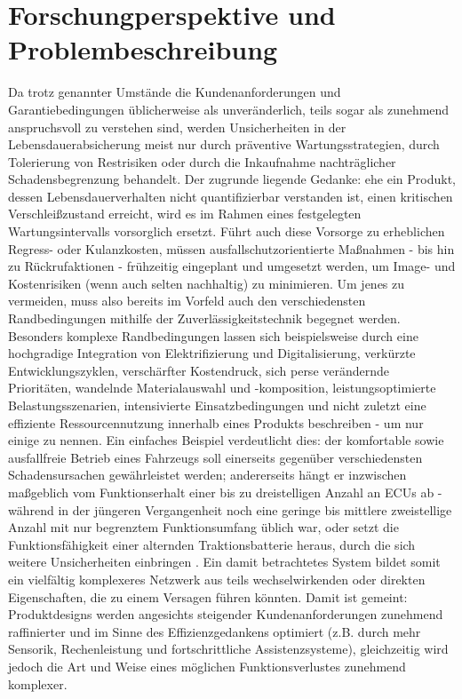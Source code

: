 \section{Forschungperspektive und Problembeschreibung}
Da trotz genannter Umstände die Kundenanforderungen und Garantiebedingungen üblicherweise als unveränderlich, teils sogar als zunehmend anspruchsvoll zu verstehen sind, werden Unsicherheiten in der Lebensdauerabsicherung meist nur durch präventive Wartungsstrategien, durch Tolerierung von Restrisiken oder durch die Inkaufnahme nachträglicher Schadensbegrenzung behandelt.
Der zugrunde liegende Gedanke: ehe ein Produkt, dessen Lebensdauerverhalten nicht quantifizierbar verstanden ist, einen kritischen Verschleißzustand erreicht, wird es im Rahmen eines festgelegten Wartungsintervalls vorsorglich ersetzt.
Führt auch diese Vorsorge zu erheblichen Regress- oder Kulanzkosten, müssen ausfallschutzorientierte Maßnahmen - bis hin zu Rückrufaktionen - frühzeitig eingeplant und umgesetzt werden, um Image- und Kostenrisiken (wenn auch selten nachhaltig) zu minimieren.
Um jenes zu vermeiden, muss also bereits im Vorfeld auch den verschiedensten Randbedingungen mithilfe der Zuverlässigkeitstechnik begegnet werden.
Besonders komplexe Randbedingungen lassen sich beispielsweise durch eine hochgradige Integration von Elektrifizierung und Digitalisierung, verkürzte Entwicklungszyklen, verschärfter Kostendruck, sich perse verändernde Prioritäten, wandelnde Materialauswahl und -komposition, leistungsoptimierte Belastungsszenarien, intensivierte Einsatzbedingungen und nicht zuletzt eine effiziente Ressourcennutzung innerhalb eines Produkts beschreiben - um nur einige zu nennen.
Ein einfaches Beispiel verdeutlicht dies: der komfortable sowie ausfallfreie Betrieb eines Fahrzeugs soll einerseits gegenüber verschiedensten Schadensursachen gewährleistet werden; andererseits hängt er inzwischen maßgeblich vom Funktionserhalt einer bis zu dreistelligen Anzahl an \acp{ECU} ab - während in der jüngeren Vergangenheit noch eine geringe bis mittlere zweistellige Anzahl mit nur begrenztem Funktionsumfang üblich war, oder setzt die Funktionsfähigkeit einer alternden Traktionsbatterie heraus, durch die sich weitere Unsicherheiten einbringen \cite{dat.2025}.
Ein damit betrachtetes System bildet somit ein vielfältig komplexeres Netzwerk aus teils wechselwirkenden oder direkten Eigenschaften, die zu einem Versagen führen könnten.
Damit ist gemeint: Produktdesigns werden angesichts steigender Kundenanforderungen zunehmend raffinierter und im Sinne des Effizienzgedankens optimiert (z.B. durch mehr Sensorik, Rechenleistung und fortschrittliche Assistenzsysteme), gleichzeitig wird jedoch die Art und Weise eines möglichen Funktionsverlustes zunehmend komplexer.
